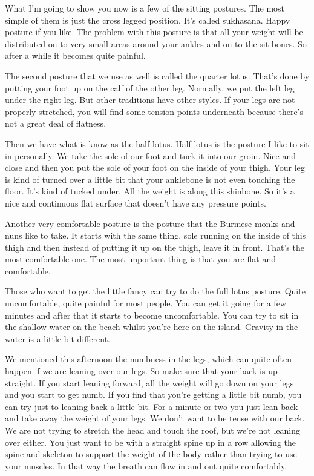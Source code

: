 \documentclass[letterpaper,10pt,english]{sphinxmanual}
\begin{document}
\sphinxAtStartPar
What I’m going to show you now is a few of the sitting postures.
The most simple of them is just the cross legged position. It’s called
sukhasana. Happy posture if you like. The problem with this posture is that
all your weight will be distributed on to very small areas around your ankles
and on to the sit bones. So after a while it becomes quite painful.

\sphinxAtStartPar
The second posture that we use as well is called the quarter lotus. That’s
done by putting your foot up on the calf of the other leg. Normally, we put
the left leg under the right leg. But other traditions have other styles. If your
legs are not properly stretched, you will find some tension points underneath
because there’s not a great deal of flatness.

\sphinxAtStartPar
Then we have what is know as the half lotus. Half lotus is the posture
I like to sit in personally. We take the sole of our foot and tuck it into our
groin. Nice and close and then you put the sole of your foot on the inside of
your thigh. Your leg is kind of turned over a little bit that your anklebone is
not even touching the floor. It’s kind of tucked under. All the weight is along
this shinbone. So it’s a nice and continuous flat surface that doesn’t have any
pressure points.

\sphinxAtStartPar
Another  very  comfortable  posture  is  the  posture  that  the  Burmese
monks and nuns like to take. It starts with the same thing, sole running on
the inside of this thigh and then instead of putting it up on the thigh, leave it
in front. That’s the most comfortable one. The most important thing is that
you are flat and comfortable.

\sphinxAtStartPar
Those who want to get the little fancy can try to do the full lotus posture.  Quite  uncomfortable,  quite  painful  for  most  people.  You  can  get  it
  going  for  a  few  minutes  and  after  that  it  starts  to  become  uncomfortable.
You can try to sit in the shallow water on the beach whilst you’re here on the
island. Gravity in the water is a little bit different.

\sphinxAtStartPar
We mentioned this afternoon the numbness in the legs, which can quite
often happen if we are leaning over our legs. So make sure that your back
is up straight. If you start leaning forward, all the weight will go down on
your legs and you start to get numb. If you find that you’re getting a little bit
numb, you can try just to leaning back a little bit. For a minute or two you
just lean back and take away the weight of your legs. We don’t want to be
tense with our back. We are not trying to stretch the head and touch the roof,
but we’re not leaning over either. You just want to be with a straight spine up
in a row allowing the spine and skeleton to support the weight of the body
rather than trying to use your muscles. In that way the breath can flow in and
out quite comfortably.
\end{document}
